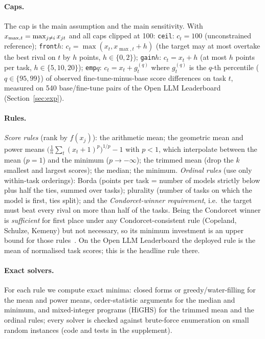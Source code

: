 \paragraph{Caps.}
The cap is the main assumption and the main sensitivity. With $x_{\max,t}=\max_{j\ne i}x_{jt}$ and all caps clipped at 100: \texttt{ceil}: $c_t=100$ (unconstrained reference); \texttt{front}$h$: $c_t=\max(x_t, x_{\max,t}+h)$ (the target may at most overtake the best rival on $t$ by $h$ points, $h\in\{0,2\}$); \texttt{gain}$h$: $c_t=x_t+h$ (at most $h$ points per task, $h\in\{5,10,20\}$); \texttt{emp}$q$: $c_t=x_t+g_t^{(q)}$ where $g_t^{(q)}$ is the $q$-th percentile ($q\in\{95,99\}$) of observed fine-tune-minus-base score differences on task $t$, measured on 540 base/fine-tune pairs of the Open LLM Leaderboard (Section~\ref{sec:exp}).

\paragraph{Rules.}
\emph{Score rules} (rank by $f(x_j)$): the arithmetic mean; the geometric mean and power means $\big(\tfrac1n\sum_t (x_t+1)^p\big)^{1/p}-1$ with $p<1$, which interpolate between the mean ($p=1$) and the minimum ($p\to-\infty$); the trimmed mean (drop the $k$ smallest and largest scores); the median; the minimum. \emph{Ordinal rules} (use only within-task orderings): Borda (points per task = number of models strictly below plus half the ties, summed over tasks); plurality (number of tasks on which the model is first, ties split); and the \emph{Condorcet-winner requirement}, i.e.\ the target must beat every rival on more than half of the tasks. Being the Condorcet winner is \emph{sufficient} for first place under any Condorcet-consistent rule (Copeland, Schulze, Kemeny) but not necessary, so its minimum investment is an upper bound for those rules~\citep{brandt2016handbook}. On the Open LLM Leaderboard the deployed rule is the mean of normalised task scores; this is the headline rule there.

\paragraph{Exact solvers.}
For each rule we compute exact minima: closed forms or greedy/water-filling for the mean and power means, order-statistic arguments for the median and minimum, and mixed-integer programs (HiGHS) for the trimmed mean and the ordinal rules; every solver is checked against brute-force enumeration on small random instances (code and tests in the supplement).


